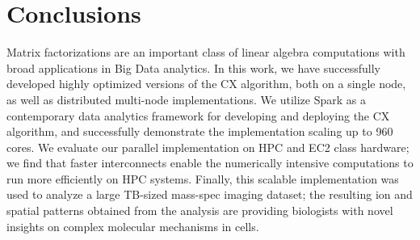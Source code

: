 \section{Conclusions}
\label{sec:conclusion}

Matrix factorizations are an important class of linear algebra computations
with broad applications in Big Data analytics. In this work, we have
successfully developed highly optimized versions of the CX algorithm, both on a
single node, as well as distributed multi-node implementations. We utilize
Spark as a contemporary data analytics framework for developing and deploying
the CX algorithm, and successfully demonstrate the implementation scaling up to
960 cores. We evaluate our parallel implementation on HPC and EC2 class
hardware; we find that faster interconnects enable the numerically intensive
computations to run more efficiently on HPC systems. Finally, this scalable
implementation was used to analyze a large TB-sized mass-spec imaging
dataset; the resulting ion and spatial patterns obtained from the analysis are
providing biologists with novel insights on complex molecular mechanisms in
cells. 

